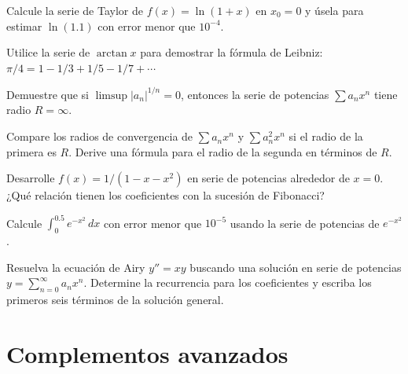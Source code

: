 \begin{prob} Calcule la serie de Taylor de $f(x) = \ln(1+x)$ en $x_0=0$
          y úsela para estimar $\ln(1.1)$ con error menor que
          $10^{-4}$.
\end{prob}

\begin{prob} Utilice la serie de $\arctan x$ para demostrar la fórmula
          de Leibniz: $\pi/4 = 1 - 1/3 + 1/5 - 1/7 + \cdots$
\end{prob}


\begin{prob} Demuestre que si $\limsup|a_n|^{1/n} = 0$, entonces la
          serie de potencias $\sum a_n x^n$ tiene radio $R = \infty$.
\end{prob}

\begin{prob} Compare los radios de convergencia de $\sum a_n x^n$ y
          $\sum a_n^2 x^n$ si el radio de la primera es $R$. Derive
          una fórmula para el radio de la segunda en términos de $R$.

\end{prob}

\begin{prob} Desarrolle $f(x) = 1/(1-x-x^2)$ en serie de potencias
          alrededor de $x=0$. ¿Qué relación tienen los coeficientes
          con la sucesión de Fibonacci?
\end{prob}

\begin{prob} Calcule $\int_0^{0.5} e^{-x^2}\,dx$ con error menor que
          $10^{-5}$ usando la serie de potencias de $e^{-x^2}$.

\end{prob}

\begin{prob} Resuelva la ecuación de Airy $y'' = xy$ buscando una
          solución en serie de potencias $y = \sum_{n=0}^\infty a_n
          x^n$. Determine la recurrencia para los coeficientes y
          escriba los primeros seis términos de la solución general.

\end{prob}

\section{Complementos avanzados}

